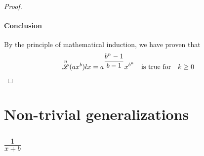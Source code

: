 \documentclass[12pt, letterpaper]{article}
\begin{document}
\begin{proof}
    \paragraph{Conclusion} By the principle of mathematical induction, we have proven that
    \begin{equation*}
        \overset{n}{\mathscr{L}} (ax^b) lx = a^{\displaystyle \frac{b^{n}-1}{b-1}}x^{b^{n}} 
        \quad \text{is true for} \quad k \ge 0
    \end{equation*}
\end{proof}



\newpage
\section{Non-trivial generalizations}

\subsection{$\frac{1}{x+b}$}
\end{document}
